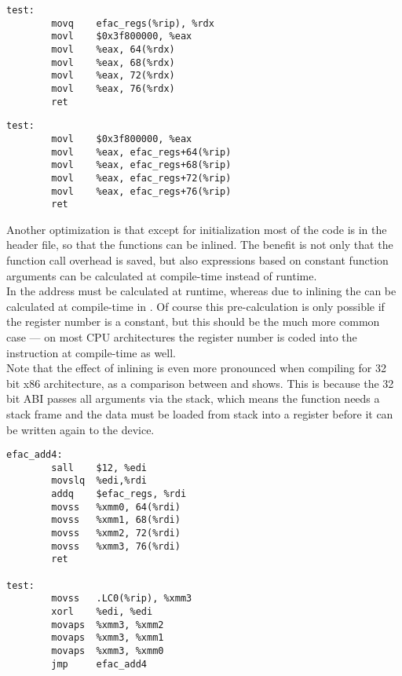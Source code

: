 \begin{lstlisting}[float=ht,caption={x86\_64 using register pointer (gcc -S -m64 -O3)},label={lst:regptr}]
test:
        movq    efac_regs(%rip), %rdx
        movl    $0x3f800000, %eax
        movl    %eax, 64(%rdx)
        movl    %eax, 68(%rdx)
        movl    %eax, 72(%rdx)
        movl    %eax, 76(%rdx)
        ret
\end{lstlisting}

\begin{lstlisting}[float=ht,caption={x86\_64 inlined (gcc -S -m64 -O3)},label={lst:inline64}]
test:
        movl    $0x3f800000, %eax
        movl    %eax, efac_regs+64(%rip)
        movl    %eax, efac_regs+68(%rip)
        movl    %eax, efac_regs+72(%rip)
        movl    %eax, efac_regs+76(%rip)
        ret
\end{lstlisting}

Another optimization is that except for initialization most of the code is
in the header file, so that the functions can be inlined. The benefit is
not only that the function call overhead is saved, but also expressions
based on constant function arguments can be calculated at compile-time
instead of runtime.\\
In  the address must be calculated at runtime,
whereas due to inlining the can be calculated at compile-time in
. Of course this pre-calculation is only possible
if the register number is a constant, but this should be the much
more common case --- on most CPU architectures the register number
is coded into the instruction at compile-time as well.\\
Note that the effect of inlining is even more pronounced when compiling
for 32 bit x86 architecture, as a comparison between 
and  shows. This is because the 32 bit ABI passes
all arguments via the stack, which means the function needs a stack
frame and the data must be loaded from stack into a register before
it can be written again to the device.\\


\begin{lstlisting}[float=ht,caption={x86\_64 not inlined (gcc -S -m64 -O3 -fno-inline)},label={lst:noinline64}]
efac_add4:
        sall    $12, %edi
        movslq  %edi,%rdi
        addq    $efac_regs, %rdi
        movss   %xmm0, 64(%rdi)
        movss   %xmm1, 68(%rdi)
        movss   %xmm2, 72(%rdi)
        movss   %xmm3, 76(%rdi)
        ret

test:
        movss   .LC0(%rip), %xmm3
        xorl    %edi, %edi
        movaps  %xmm3, %xmm2
        movaps  %xmm3, %xmm1
        movaps  %xmm3, %xmm0
        jmp     efac_add4
\end{lstlisting}

